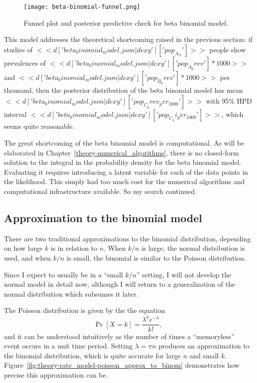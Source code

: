 \begin{figure}[ht]
\begin{center}
\texttt{[image: beta-binomial-funnel.png]}
\end{center}
\caption{Funnel plot and posterior predictive check for beta binomial model.}
\label{fig:theory-rate_beta-binomial-funnel}
\end{figure}

This model addresses the theoretical shortcoming raised in the
previous section: if studies of
$<<d['beta_binomial_model.json|dexy']['pop_A_N']>>$ people show prevalences
of $<<d['beta_binomial_model.json|dexy']['pop_A_prev']*1000>>$ and
$<<d['beta_binomial_model.json|dexy']['pop_B_prev']*1000>>$ per thousand,
then the posterior distribution of the beta binomial model has mean
$<<d['beta_binomial_model.json|dexy']['pop_C_prev_per_1000']>>$ with 95\%
HPD interval $<<d['beta_binomial_model.json|dexy']['pop_C_ui_per_1000']>>$,
which seems quite reasonable.

The great shortcoming of the beta binomial model is computational.  As
will be elaborated in Chapter~\ref{theory-numerical_algorithms}, there
is no closed-form solution to the integral in the probability density
for the beta binomial model.  Evaluating it requires introducing a
latent variable for each of the data points in the likelihood.  This
simply had too much cost for the numerical algorithms and
computational infrastructure available.  So my search
continued.

\subsection{Approximation to the binomial model}
There are two traditional approximations to the binomial distribution,
depending on how large $k$ is in relation to $n$.  When $k/n$ is
large, the normal distribution is used, and when $k/n$ is small, the
binomial is similar to the Poisson distribution.

Since I expect to usually be in a ``small $k/n$'' setting, I will not
develop the normal model in detail now, although I will return to a
generalization of the normal distribution which subsumes it later.

The Poisson distribution is given by the the equation
\[
\Pr[X=k] = \frac{\lambda^k e^{-\lambda}}{k!},
\]
and it can be understood intuitively as the number of times a
``memoryless'' event occurs in a unit time period.  Setting $\lambda =
\pi n$ produces an approximation to the binomial distribution, which
is quite accurate for large $n$ and small $k$.
Figure~\ref{fig:theory-rate_model-poisson_approx_to_binom}
demonstrates how precise this approximation can be.

